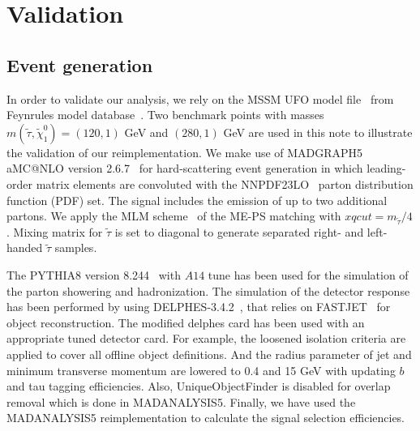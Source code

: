 \documentclass{ws-mpla}
\begin{document}
\section{Validation}

\subsection{Event generation}

In order to validate our analysis, we rely on the MSSM UFO model file~\cite{Duhr:2011se} from Feynrules model database~\cite{Alloul:2013bka}. 
Two benchmark points with masses $m(\tilde{\tau},\tilde{\chi}^0_1)=(120,1)$ GeV and $(280,1)$ GeV are used in this note to illustrate the validation of our reimplementation.
We make use of MADGRAPH5 aMC@NLO version 2.6.7~\cite{Alwall:2014hca} for hard-scattering event generation in which leading-order matrix elements are convoluted with the NNPDF23LO~\cite{Martin:2009iq} parton distribution function (PDF) set. The signal includes the emission of up to two additional partons. We apply the MLM scheme~\cite{Mangano:2006rw,Alwall:2008qv} of the ME-PS matching with $xqcut = m_{\tilde{\tau}}/4$.
Mixing matrix for $\tilde{\tau}$ is set to diagonal to generate separated right- and left-handed $\tilde{\tau}$ samples.

The PYTHIA8 version 8.244~\cite{Sjostrand:2007gs} with $A14$ tune has been used for the simulation of the parton showering and hadronization. The simulation of the detector response has been performed by using DELPHES-3.4.2~\cite{deFavereau:2013fsa}, that relies on FASTJET~\cite{Cacciari:2011ma} for object reconstruction.
The modified delphes card has been used with an appropriate tuned detector card.
For example, the loosened isolation criteria are applied to cover all offline object definitions.
And the radius parameter of jet and minimum transverse momentum are lowered to 0.4 and 15 GeV with updating $b$ and tau tagging efficiencies.
Also, UniqueObjectFinder is disabled for overlap removal which is done in MADANALYSIS5.
Finally, we have used the MADANALYSIS5 reimplementation to calculate the signal selection efficiencies.
\end{document}
